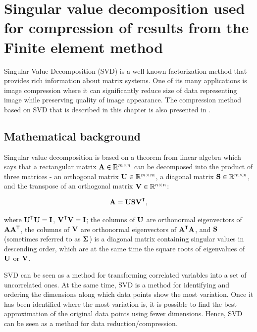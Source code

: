 \chapter{Singular value decomposition used for compression of results from the Finite element method}
\label{appendix-SVD}

Singular Value Decomposition (SVD) is a well known factorization method that provides rich information about matrix systems. One of its many applications is image compression where it can significantly reduce size of data representing image while preserving quality of image appearance. The compression method based on SVD that is described in this chapter is also presented in \cite{Benes2017}.


\section{Mathematical background}


Singular value decomposition \cite{Baker2005, Kalman1996, Golub1996} is based on a theorem from linear algebra which says that a rectangular matrix $\mathbf{A} \in \mathbb{R}^{m \times n}$ can be decomposed into the product of three matrices - an orthogonal matrix $\mathbf{U} \in \mathbb{R}^{m \times m}$, a diagonal
matrix $\mathbf{S} \in \mathbb{R}^{m \times n}$, and the transpose of an orthogonal matrix $\mathbf{V} \in \mathbb{R}^{n \times n}$:

\begin{equation}
\mathbf{A} = \mathbf{U} \mathbf{S} \mathbf{V}^\mathsf{T},
\label{eq:svd-def}
\end{equation}

\noindent
where $\mathbf{U^\mathsf{T}U} = \mathbf{I}$, $\mathbf{V^\mathsf{T}V} = \mathbf{I}$; the columns of $\mathbf{U}$ are orthonormal eigenvectors of $\mathbf{AA^\mathsf{T}}$, the columns of $\mathbf{V}$ are orthonormal eigenvectors of $\mathbf{A^\mathsf{T}A}$, and $\mathbf{S}$ (sometimes referred to as $\mathbf{\Sigma}$) is a diagonal matrix containing singular values in descending order, which are at the same time the square roots of eigenvalues of $\mathbf{U}$ or $\mathbf{V}$.

SVD can be seen as a method for transforming correlated variables into a set of uncorrelated ones. At the same time, SVD is a method for identifying and ordering the dimensions along which data points show the most variation. Once it has been identified where the most variation is, it is possible to find the best approximation of the original data points using fewer dimensions. Hence, SVD can be seen as a method for data reduction/compression.

